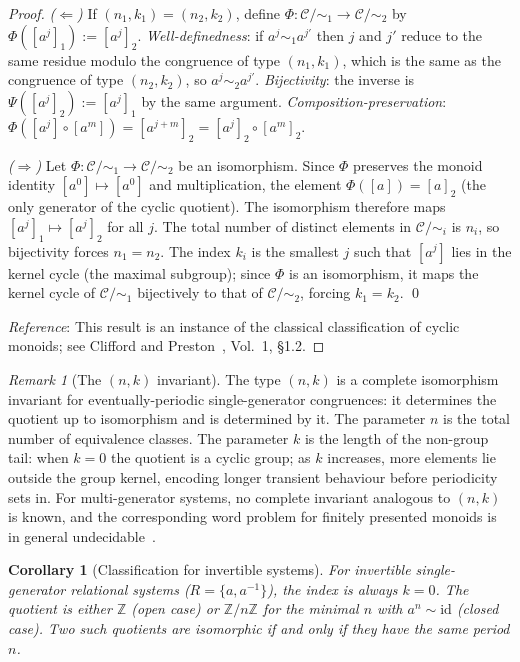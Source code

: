 \documentclass{article}
\newtheorem{corollary}[theorem]{Corollary}
\theoremstyle{definition}
\theoremstyle{remark}
\newtheorem{remark}[theorem]{Remark}
\newcommand{\RC}{\mathcal{C}}
\newcommand{\id}{\mathrm{id}}
\begin{document}
\begin{proof}
\textit{($\Leftarrow$)} If $(n_1,k_1) = (n_2,k_2)$, define
$\Phi : \RC/{\sim_1} \to \RC/{\sim_2}$ by
$\Phi([a^j]_1) := [a^j]_2$.
\emph{Well-definedness}: if $a^j \sim_1 a^{j'}$ then $j$ and
$j'$ reduce to the same residue modulo the congruence of type
$(n_1,k_1)$, which is the same as the congruence of type
$(n_2,k_2)$, so $a^j \sim_2 a^{j'}$. \emph{Bijectivity}: the
inverse is $\Psi([a^j]_2) := [a^j]_1$ by the same argument.
\emph{Composition-preservation}: $\Phi([a^j]\circ[a^m]) =
[a^{j+m}]_2 = [a^j]_2 \circ [a^m]_2$.

\textit{($\Rightarrow$)} Let $\Phi : \RC/{\sim_1} \to \RC/{\sim_2}$
be an isomorphism. Since $\Phi$ preserves the monoid identity
$[a^0] \mapsto [a^0]$ and multiplication, the element $\Phi([a])
= [a]_2$ (the only generator of the cyclic quotient). The
isomorphism therefore maps $[a^j]_1 \mapsto [a^j]_2$ for all
$j$. The total number of distinct elements in $\RC/{\sim_i}$ is
$n_i$, so bijectivity forces $n_1 = n_2$. The index $k_i$ is
the smallest $j$ such that $[a^j]$ lies in the kernel cycle
(the maximal subgroup); since $\Phi$ is an isomorphism, it
maps the kernel cycle of $\RC/{\sim_1}$ bijectively to that of
$\RC/{\sim_2}$, forcing $k_1 = k_2$. \qed

\textit{Reference}: This result is an instance of the classical
classification of cyclic monoids; see Clifford and
Preston~\cite{cliffordpreston}, Vol.~1, \S1.2.
\end{proof}

\begin{remark}[The $(n,k)$ invariant]
\label{rem:nkinvariant}
The type $(n,k)$ is a complete isomorphism invariant for
eventually-periodic single-generator congruences: it determines
the quotient up to isomorphism and is determined by it. The
parameter $n$ is the total number of equivalence classes.
The parameter $k$ is the length of the non-group tail: when
$k = 0$ the quotient is a cyclic group; as $k$ increases, more
elements lie outside the group kernel, encoding longer transient
behaviour before periodicity sets in. For multi-generator
systems, no complete invariant analogous to $(n,k)$ is known,
and the corresponding word problem for finitely presented monoids
is in general undecidable~\cite{knuthbendix}.
\end{remark}

\begin{corollary}[Classification for invertible systems]
\label{cor:invertible_classification}
For invertible single-generator relational systems
($R = \{a, a^{-1}\}$), the index is always $k = 0$. The
quotient is either $\mathbb{Z}$ (open case) or
$\mathbb{Z}/n\mathbb{Z}$ for the minimal $n$ with $a^n \sim \id$
(closed case). Two such quotients are isomorphic if and only if
they have the same period $n$.
\end{corollary}
\end{document}
